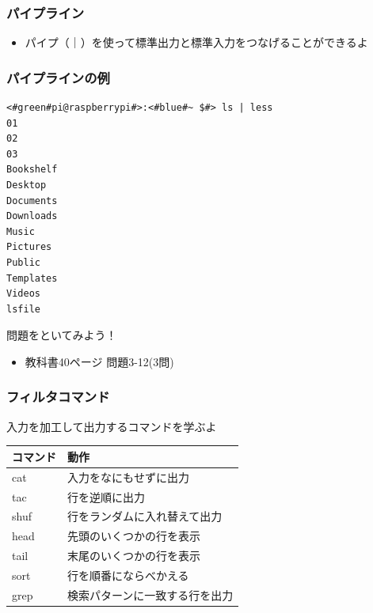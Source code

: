 \documentclass[slide03.tex]{subfiles}
\begin{document}
\begin{frame}
    \frametitle{パイプライン}
    \vspace{2em}
    \begin{itemize}
        \item パイプ（｜）を使って標準出力と標準入力をつなげることができるよ
    \end{itemize}
    \begin{figure}
        \centering
        
    \end{figure}
\end{frame}

\begin{frame}[fragile]
    \frametitle{パイプラインの例}
    \begin{lstlisting}[title=lsコマンドの出力をパイプでlessコマンドに渡す, label=redirectCat]
<#green#pi@raspberrypi#>:<#blue#~ $#> ls | less
01
02
03
Bookshelf
Desktop
Documents
Downloads
Music
Pictures
Public
Templates
Videos
lsfile
    \end{lstlisting}
\end{frame}

\begin{frame}
    \begin{exampleblock}{問題をといてみよう！}
        \begin{itemize}
            \item 教科書40ページ 問題3-12(3問)
        \end{itemize}
    \end{exampleblock}
\end{frame}

\begin{frame}
    \frametitle{フィルタコマンド}
    入力を加工して出力するコマンドを学ぶよ\\
    \vspace{\zh}
    \begin{tabular}{ll}
        コマンド & 動作                               \\ \hline
        cat      & 入力をなにもせずに出力         \\
        tac      & 行を逆順に出力                 \\
        shuf     & 行をランダムに入れ替えて出力   \\
        head     & 先頭のいくつかの行を表示       \\
        tail     & 末尾のいくつかの行を表示       \\
        sort     & 行を順番にならべかえる         \\
        grep     & 検索パターンに一致する行を出力 \\ \hline
    \end{tabular}
\end{frame}
\end{document}
